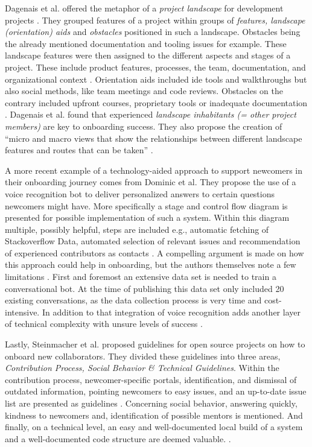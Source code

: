 Dagenais et al. offered the metaphor of a \textit{project landscape} for development projects \cite{dagenais2010moving}. They grouped features of a project within groups of \textit{features, landscape (orientation) aids} and \textit{obstacles} positioned in such a landscape. Obstacles being the already mentioned documentation and tooling issues for example. These landscape features were then assigned to the different aspects and stages of a project. These include product features, processes, the team, documentation, and organizational context \cite[p. 278]{dagenais2010moving}. Orientation aids included \gls{ide} tools and walkthroughs but also social methods, like team meetings and code reviews. Obstacles on the contrary included upfront courses, proprietary tools or inadequate documentation \cite[p. 278]{dagenais2010moving}. Dagenais et al. found that experienced \textit{landscape inhabitants (= other project members)} are key to onboarding success. They also propose the creation of \enquote{micro and macro views that show the relationships between different landscape features and routes that can be taken} \cite[p. 284]{dagenais2010moving}.

A more recent example of a technology-aided approach to support newcomers in their onboarding journey comes from Dominic et al. They propose the use of a voice recognition bot to deliver personalized answers to certain questions newcomers might have. More specifically a stage and control flow diagram is presented for possible implementation of such a system. Within this diagram multiple, possibly helpful, steps are included e.g., automatic fetching of Stackoverflow Data, automated selection of relevant issues and recommendation of experienced contributors as contacts \cite[p. 48]{dominic2020onboarding}. A compelling argument is made on how this approach could help in onboarding, but the authors themselves note a few limitations \cite[p. 49]{dominic2020onboarding}. First and foremost an extensive data set is needed to train a conversational bot. At the time of publishing this data set only included 20 existing conversations, as the data collection process is very time and cost-intensive. In addition to that integration of voice recognition adds another layer of technical complexity with unsure levels of success \cite{dominic2020onboarding}.

Lastly, Steinmacher et al. proposed guidelines for open source projects on how to onboard new collaborators. They divided these guidelines into three areas, \textit{Contribution Process, Social Behavior \& Technical Guidelines}. Within the contribution process, newcomer-specific portals, identification, and dismissal of outdated information, pointing newcomers to easy issues, and an up-to-date issue list are presented as guidelines \cite[p. 7-8]{steinmacher2018let}. Concerning social behavior, answering quickly, kindness to newcomers and, identification of possible mentors is mentioned. And finally, on a technical level, an easy and well-documented local build of a system and a well-documented code structure are deemed valuable. \cite{steinmacher2018let}.

